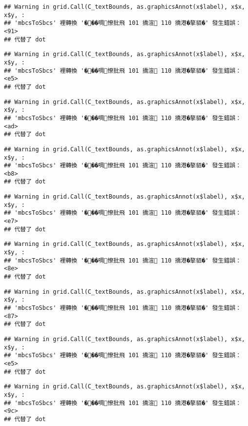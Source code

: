 \documentclass[
]{article}
\begin{document}
\begin{verbatim}
## Warning in grid.Call(C_textBounds, as.graphicsAnnot(x$label), x$x, x$y, :
## 'mbcsToSbcs' 裡轉換 '���啁憭批飛 101 撟渲 110 撟港�摮貊�' 發生錯誤：<91>
## 代替了 dot
\end{verbatim}

\begin{verbatim}
## Warning in grid.Call(C_textBounds, as.graphicsAnnot(x$label), x$x, x$y, :
## 'mbcsToSbcs' 裡轉換 '���啁憭批飛 101 撟渲 110 撟港�摮貊�' 發生錯誤：<e5>
## 代替了 dot
\end{verbatim}

\begin{verbatim}
## Warning in grid.Call(C_textBounds, as.graphicsAnnot(x$label), x$x, x$y, :
## 'mbcsToSbcs' 裡轉換 '���啁憭批飛 101 撟渲 110 撟港�摮貊�' 發生錯誤：<ad>
## 代替了 dot
\end{verbatim}

\begin{verbatim}
## Warning in grid.Call(C_textBounds, as.graphicsAnnot(x$label), x$x, x$y, :
## 'mbcsToSbcs' 裡轉換 '���啁憭批飛 101 撟渲 110 撟港�摮貊�' 發生錯誤：<b8>
## 代替了 dot
\end{verbatim}

\begin{verbatim}
## Warning in grid.Call(C_textBounds, as.graphicsAnnot(x$label), x$x, x$y, :
## 'mbcsToSbcs' 裡轉換 '���啁憭批飛 101 撟渲 110 撟港�摮貊�' 發生錯誤：<e7>
## 代替了 dot
\end{verbatim}

\begin{verbatim}
## Warning in grid.Call(C_textBounds, as.graphicsAnnot(x$label), x$x, x$y, :
## 'mbcsToSbcs' 裡轉換 '���啁憭批飛 101 撟渲 110 撟港�摮貊�' 發生錯誤：<8e>
## 代替了 dot
\end{verbatim}

\begin{verbatim}
## Warning in grid.Call(C_textBounds, as.graphicsAnnot(x$label), x$x, x$y, :
## 'mbcsToSbcs' 裡轉換 '���啁憭批飛 101 撟渲 110 撟港�摮貊�' 發生錯誤：<87>
## 代替了 dot
\end{verbatim}

\begin{verbatim}
## Warning in grid.Call(C_textBounds, as.graphicsAnnot(x$label), x$x, x$y, :
## 'mbcsToSbcs' 裡轉換 '���啁憭批飛 101 撟渲 110 撟港�摮貊�' 發生錯誤：<e5>
## 代替了 dot
\end{verbatim}

\begin{verbatim}
## Warning in grid.Call(C_textBounds, as.graphicsAnnot(x$label), x$x, x$y, :
## 'mbcsToSbcs' 裡轉換 '���啁憭批飛 101 撟渲 110 撟港�摮貊�' 發生錯誤：<9c>
## 代替了 dot
\end{verbatim}
\end{document}
